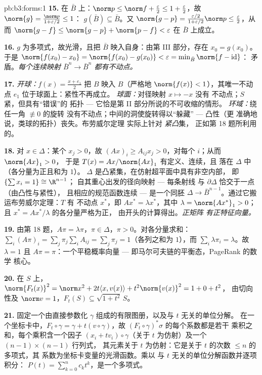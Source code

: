 \begin{solution}{pb:b3:forms:1}
\textbf{15.} 在 $\bar B$ 上：$\norm p \leq \norm f +
\frac\varepsilon2 \leq 1 + \frac\varepsilon2$，故
$\norm{g} = \frac{\norm p}{1 + \varepsilon/2} \leq 1$：
$g(\bar B) \subseteq \bar B$。又 $\norm{g - p} =
\frac{\varepsilon/2}{1 + \varepsilon/2}\norm p \leq
\frac\varepsilon2$，从而 $\norm{g - f} \leq \norm{g - p} +
\norm{p - f} < \varepsilon$ 在 $\bar B$ 上成立。

\textbf{16.} $g$ 为多项式，故光滑，且把
$\bar B$ 映入自身：由第 III 部分，存在 $x_0 = g(x_0)$。
于是 $\norm{f(x_0) - x_0} = \norm{f(x_0) - g(x_0)} <
\varepsilon = \min_{\bar B}\norm{f - \operatorname{id}}$：
矛盾。\emph{每个连续映射 $\bar B^n \to
\bar B^n$ 都有不动点。}

\textbf{17.} \emph{开球：}$f(x) = \frac{x + e_1}2$ 把
$B$ 映入 $B$（严格地 $\norm{f(x)} < 1$），其唯一不动点
$e_1$ 位于球面上：紧性不再成立。
\emph{球面：}对径映射 $x \mapsto -x$ 没有
不动点；$S$ 紧，但具有“错误”的
拓扑 --- 它恰是第 II 部分所说的不可收缩的情形。
\emph{环域：}绕任一角 $\not\equiv 0$ 的旋转
没有不动点；中间的洞使旋转得以“躲藏” --- 凸性（更
准确地说，类球的拓扑）丧失。布劳威尔定理
实际上针对 \emph{紧凸}集，
正如第 18 题所利用的。

\textbf{18.} 对 $x \in \Delta$：某个 $x_j > 0$，故 $(Ax)_i
\geq A_{ij}x_j > 0$，对每个 $i$；从而 $\norm{Ax}_1 > 0$，
于是 $T(x) = Ax/\norm{Ax}_1$ 有定义、连续，且
落在 $\Delta$ 中（各分量为正且和为 $1$）。
$\Delta$ 是凸紧集，在仿射超平面中具有非空内部，
即 $\{\sum x_i = 1\} \cong \R^{n-1}$；
自其重心出发的径向映射 --- 每条射线
与 $\partial\Delta$ 恰交于一点（由凸性与紧性），
且相应的规范函数连续 ---
是一个同胚 $\Delta \to
\bar B^{n-1}$。通过它搬运布劳威尔定理：$T$ 有
不动点 $x^*$，即 $Ax^* = \lambda x^*$，其中 $\lambda
= \norm{Ax^*}_1 > 0$；且 $x^* = Ax^*/\lambda$ 的各分量严格为正，
由开头的计算得出。\emph{正矩阵
有正特征向量。}

\textbf{19.} 由第 18 题，$A\pi = \lambda\pi$，$\pi \in
\Delta$，$\pi > 0$。对各分量求和：$\sum_i(A\pi)_i =
\sum_j\pi_j\sum_iA_{ij} = \sum_j\pi_j = 1$（各列之和为
$1$），而 $\sum_i\lambda\pi_i = \lambda$。故 $\lambda = 1$
且 $A\pi = \pi$：一个平稳概率向量 ---
即马尔可夫链的平衡态，PageRank 的数学
核心。

\textbf{20.} 在 $S$ 上，$\norm{F_t(x)}^2 = \norm x^2 +
2t\langle x, v(x)\rangle + t^2\norm{v(x)}^2 = 1 + 0 + t^2$，
由切向性及 $\norm v = 1$，$F_t(S) \subseteq
\sqrt{1+t^2}\,S$。

\textbf{21.} 固定一个由直接参数化
$\gamma$ 组成的有限图册，以及与 $t$ 无关的单位分解。
在一个坐标卡中，$F_t\circ\gamma = \gamma + t(v\circ\gamma)$，故
$(F_t\circ\gamma)^*\sigma$ 的每个系数都是若干
乘积之和，每个乘积含一个因子 $(x_i + tv_i)\circ\gamma$（关于
$t$ 为仿射）及一个 $(n-1)\times(n-1)$ 行列式，
其元素关于 $t$ 为仿射：它是关于 $t$ 的次数 $\leq n$ 的多项式，其
系数为坐标卡变量的光滑函数。乘以
与 $t$ 无关的单位分解函数并逐项积分：
$P(t) = \sum_{k=0}^n c_kt^k$，是一个多项式。


\end{solution}
